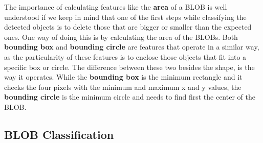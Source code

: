 The importance of calculating features like the \textbf{area} of a BLOB is well understood if we keep in mind that one of the first steps while classifying the detected objects is to delete those that are bigger or smaller than the expected ones. One way of doing this is by calculating the area of the BLOBs.
Both \textbf{bounding box} and \textbf{bounding circle} are features that operate in a similar way, as the particularity of these features is to enclose those objects that fit into a specific box or circle. The difference between these two besides the shape, is the way it operates. While the \textbf{bounding box} is the minimum rectangle and it checks the four pixels with the minimum and maximum x and y values, the \textbf{bounding circle} is the minimum circle and needs to find first the center of the BLOB.


\subsection{BLOB Classification}
